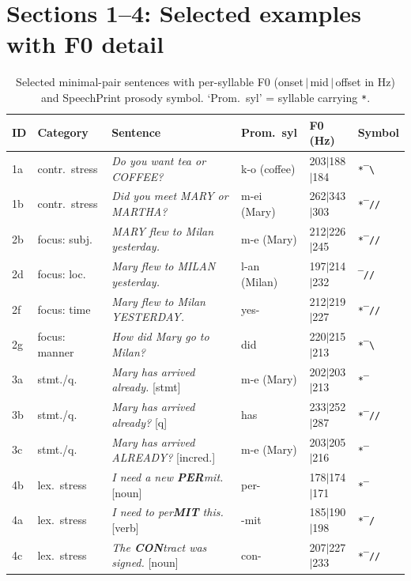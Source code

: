 \section*{Sections 1--4: Selected examples with F0 detail}

\begin{table}[h]
\centering
\caption{Selected minimal-pair sentences with per-syllable F0 (onset\,$|$\,mid\,$|$\,offset
in Hz) and SpeechPrint prosody symbol.
`Prom.\ syl' = syllable carrying \texttt{*}.}
\label{tab:english_selected}
\small
\begin{tabular}{llllll}
\toprule
ID & Category & Sentence & Prom.\ syl & F0 (Hz) & Symbol \\
\midrule
1a & contr.\ stress
   & \textit{Do you want tea or COFFEE?}
   & k-o (coffee)  & 203$|$188$|$184 & \texttt{*‾\textbackslash} \\
1b & contr.\ stress
   & \textit{Did you meet MARY or MARTHA?}
   & m-ei (Mary)   & 262$|$343$|$303 & \texttt{*‾//} \\
\midrule
2b & focus: subj.
   & \textit{MARY flew to Milan yesterday.}
   & m-e (Mary)    & 212$|$226$|$245 & \texttt{*‾//} \\
2d & focus: loc.
   & \textit{Mary flew to MILAN yesterday.}
   & l-an (Milan)  & 197$|$214$|$232 & \texttt{‾//} \\
2f & focus: time
   & \textit{Mary flew to Milan YESTERDAY.}
   & yes-          & 212$|$219$|$227 & \texttt{*‾//} \\
2g & focus: manner
   & \textit{How did Mary go to Milan?}
   & did           & 220$|$215$|$213 & \texttt{*‾\textbackslash} \\
\midrule
3a & stmt./q.
   & \textit{Mary has arrived already.} [stmt]
   & m-e (Mary)    & 202$|$203$|$213 & \texttt{*‾} \\
3b & stmt./q.
   & \textit{Mary has arrived already?} [q]
   & has           & 233$|$252$|$287 & \texttt{*‾//} \\
3c & stmt./q.
   & \textit{Mary has arrived ALREADY?} [incred.]
   & m-e (Mary)    & 203$|$205$|$216 & \texttt{*‾} \\
\midrule
4b & lex.\ stress
   & \textit{I need a new \textbf{PER}mit.} [noun]
   & per-          & 178$|$174$|$171 & \texttt{*‾} \\
4a & lex.\ stress
   & \textit{I need to per\textbf{MIT} this.} [verb]
   & -mit          & 185$|$190$|$198 & \texttt{*‾/} \\
4c & lex.\ stress
   & \textit{The \textbf{CON}tract was signed.} [noun]
   & con-          & 207$|$227$|$233 & \texttt{*‾//} \\
\bottomrule
\end{tabular}
\end{table}

